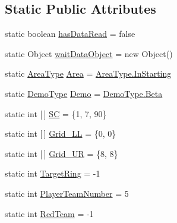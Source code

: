 \subsection*{Static Public Attributes}
\begin{DoxyCompactItemize}
\item 
static boolean \hyperlink{enumca_1_1mcgill_1_1ecse211_1_1project_1_1_game_parameters_a77c0c105458a1f570bd6f726a84f3dd5}{has\+Data\+Read} = false
\item 
static Object \hyperlink{enumca_1_1mcgill_1_1ecse211_1_1project_1_1_game_parameters_a80acbb2b7423c79211e7eb1bd4df8545}{wait\+Data\+Object} = new Object()
\item 
static \hyperlink{enumca_1_1mcgill_1_1ecse211_1_1project_1_1_game_parameters_1_1_area_type}{Area\+Type} \hyperlink{enumca_1_1mcgill_1_1ecse211_1_1project_1_1_game_parameters_a32080f9c0e2e23c0feefc272620a07ad}{Area} = \hyperlink{enumca_1_1mcgill_1_1ecse211_1_1project_1_1_game_parameters_1_1_area_type_a90e9cb33114c7af62aa86684942265e5}{Area\+Type.\+In\+Starting}
\item 
static \hyperlink{enumca_1_1mcgill_1_1ecse211_1_1project_1_1_game_parameters_1_1_demo_type}{Demo\+Type} \hyperlink{enumca_1_1mcgill_1_1ecse211_1_1project_1_1_game_parameters_a36e932159f5f7e0f5e2e78f00d6f7e93}{Demo} = \hyperlink{enumca_1_1mcgill_1_1ecse211_1_1project_1_1_game_parameters_1_1_demo_type_a8d4e576df991cb52b50ae54b2812aa7f}{Demo\+Type.\+Beta}
\item 
static int \mbox{[}$\,$\mbox{]} \hyperlink{enumca_1_1mcgill_1_1ecse211_1_1project_1_1_game_parameters_af3944d1bc80c4c8a6cabce66e030f4b7}{SC} = \{1, 7, 90\}
\item 
static int \mbox{[}$\,$\mbox{]} \hyperlink{enumca_1_1mcgill_1_1ecse211_1_1project_1_1_game_parameters_ab190471dbd9bb10d8cef92c1b8bea826}{Grid\+\_\+\+LL} = \{0, 0\}
\item 
static int \mbox{[}$\,$\mbox{]} \hyperlink{enumca_1_1mcgill_1_1ecse211_1_1project_1_1_game_parameters_afbbca622863f674dfb00dcd93e1328cb}{Grid\+\_\+\+UR} = \{8, 8\}
\item 
static int \hyperlink{enumca_1_1mcgill_1_1ecse211_1_1project_1_1_game_parameters_a58f3515615bd8e55a036615a23b8ff80}{Target\+Ring} = -\/1
\item 
static int \hyperlink{enumca_1_1mcgill_1_1ecse211_1_1project_1_1_game_parameters_aa3fb61a4aa9d34ab4dd029eccb6e056c}{Player\+Team\+Number} = 5
\item 
static int \hyperlink{enumca_1_1mcgill_1_1ecse211_1_1project_1_1_game_parameters_ad36fe5629718c944df7317e53145850c}{Red\+Team} = -\/1

\end{DoxyCompactItemize}
